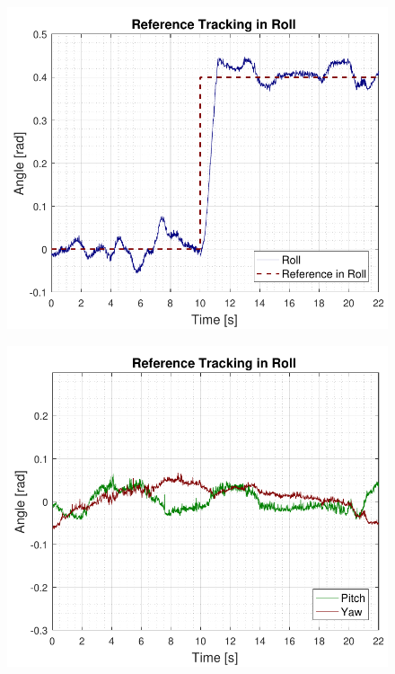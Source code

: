 \begin{minipage}{\linewidth}
    \begin{minipage}{0.46\linewidth}
        \begin{figure}[H]
            \includegraphics[scale=.55]{figures/AccepttestRefTrackRoll.pdf}
            \centering			
            \label{fig:AccepttestRefTrackRoll}
        \end{figure}
    \end{minipage}
    \hspace{0.03\linewidth}
    \begin{minipage}{0.46\linewidth}
        \begin{figure}[H]
            \includegraphics[scale=.55]{figures/AccepttestRefTrackRollPitchYaw.pdf}
            \centering
            \label{fig:AccepttestRefTrackRollPitchYaw}
        \end{figure}
    \end{minipage}
\end{minipage}

